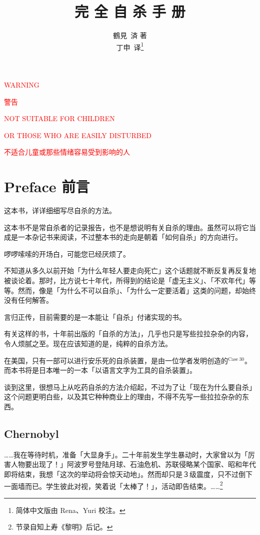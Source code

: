 \documentclass[UTF8]{ctexart}
\title{完 %
全        %
自        %
杀        %
手        %
册}
\author{鶴見\ 済 著\\[1ex] 
\small 丁申\ 译\thanks{简体中文版由 Rena、Yuri 校注。}}
\date{}
\begin{document}


\centerline{\large{\textcolor{red}{WARNING}}}
\centerline{\large{\textcolor{red}{警告}}}

\centerline{\textcolor{red}{NOT SUITABLE FOR CHILDREN }}
\centerline{\textcolor{red}{OR THOSE WHO ARE EASILY DISTURBED}}
\centerline{\textcolor{red}{不适合儿童或那些情绪容易受到影响的人}}


\newpage

\maketitle

\newpage
\tableofcontents
\newpage

\section{Preface 前言}

这本书，详详细细写尽自杀的方法。

这本书不是常自杀者的记录报告，也不是想说明有关自杀的理由。虽然可以将它当成是一本杂记书来阅读，不过整本书的走向是朝着「如何自杀」的方向进行。

啰啰嗦嗦的开场白，可能您已经厌烦了。

不知道从多久以前开始「为什么年轻人要走向死亡」这个话题就不断反复再反复地被谈论着。那时，比方说七十年代，所得到的结论是「虚无主义」、「不欢年代」等等。然而，像是「为什么不可以自杀」、「为什么一定要活着」这类的问题，却始终没有任何解答。

言归正传，目前需要的是一本能让「自杀」付诸实现的书。

有关这样的书，十年前出版的「自杀的方法」，几乎也只是写些拉拉杂杂的内容，令人烦腻之至。现在应该知道的是，纯粹的自杀方法。

在美国，只有一部可以进行安乐死的自杀装置，是由一位学者发明创造的$^{\mathrm{Case\ 30}}$。而本书将是日本唯一的一本「以语言文字为工具的自杀装置」。

谈到这里，很想马上从吃药自杀的方法介绍起，不过为了让「现在为什么要自杀」这个问题更明白些，以及其它种种商业上的理由，不得不先写一些拉拉杂杂的东西。

\subsection{Chernobyl}

……我在等待时机，准备「大显身手」。二十年前发生学生暴动时，大家曾以为「厉害人物要出现了！」阿波罗号登陆月球、石油危机、苏联侵略某个国家、昭和年代即将结束，我想「这次的举动将会惊天动地」。然而却只是３级震度，只不过倒下一面墙而已。学生彼此对视，笑着说「太棒了！」，活动即告结束。……\footnote{节录自知上寿《黎明》后记。}
\end{document}
